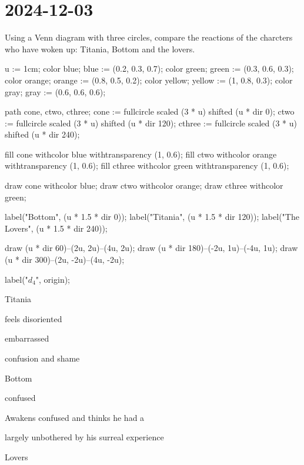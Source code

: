 \section{2024-12-03}

\startframedtask
Using a Venn diagram with three circles, compare the reactions of the charcters
who have woken up: Titania, Bottom and the lovers.
\stopframedtask


\startMPpage

u := 1cm;
color blue; blue := (0.2, 0.3, 0.7);
color green; green := (0.3, 0.6, 0.3);
color orange; orange := (0.8, 0.5, 0.2);
color yellow; yellow := (1, 0.8, 0.3);
color gray; gray := (0.6, 0.6, 0.6);


path cone, ctwo, cthree;
cone := fullcircle scaled (3 * u) shifted (u * dir 0);
ctwo := fullcircle scaled (3 * u) shifted (u * dir 120);
cthree := fullcircle scaled (3 * u) shifted (u * dir 240);

fill cone withcolor blue withtransparency (1, 0.6);
fill ctwo withcolor orange withtransparency (1, 0.6);
fill cthree withcolor green withtransparency (1, 0.6);

draw cone withcolor blue;
draw ctwo withcolor orange;
draw cthree withcolor green;

label("Bottom", (u * 1.5 * dir 0));
label("Titania", (u * 1.5 * dir 120));
label("The Lovers", (u * 1.5 * dir 240));

draw (u * dir 60)--(2u, 2u)--(4u, 2u);
draw (u * dir 180)--(-2u, 1u)--(-4u, 1u);
draw (u * dir 300)--(2u, -2u)--(4u, -2u);

label("$d_4$", origin);



\stopMPpage
\stopbuffer


\startitemize[packed]
\item Titania
\startitemize[packed]
\item feels disoriented
\item embarrassed
\item confusion and shame
\stopitemize
\item Bottom
\startitemize[packed]
\item confused
\item Awakens confused and thinks he had a 
\item largely unbothered by his surreal experience
\stopitemize
\item Lovers
\startitemize[packed]
\item 
\stopitemize
\stopitemize
